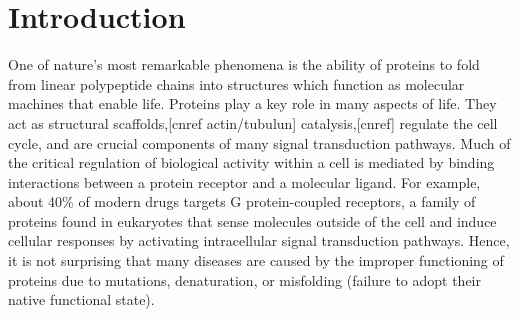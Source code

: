 \chapter{Introduction}



One of nature's most remarkable phenomena is the ability of proteins to fold from linear polypeptide chains into structures which function as molecular machines that enable life. \cite{Dill:2008et,Lappano:2011ve} Proteins play a key role in many aspects of life. They act as structural scaffolds,[cnref actin/tubulun] catalysis,[cnref] regulate the cell cycle,\cite{Klionsky:2000ty,Hetts:1998tr} and are crucial components of many signal transduction pathways.\cite{Birnbaumer:1990ux}
Much of the critical regulation of biological activity within a cell is mediated by binding interactions between a protein receptor and a molecular ligand.\cite{Overington:2006ub} For example, about 40\% of modern drugs targets G protein-coupled receptors,\cite{Overington:2006ub} a family of proteins found in eukaryotes that sense molecules outside of the cell and induce cellular responses by activating intracellular signal transduction pathways.\cite{Kroeze:2003ub} Hence, it is not surprising that many diseases are caused by the improper functioning of proteins due to mutations, denaturation, or misfolding (failure to adopt their native functional state).\cite{Hanahan:2000wo,Lappano:2011ve}

